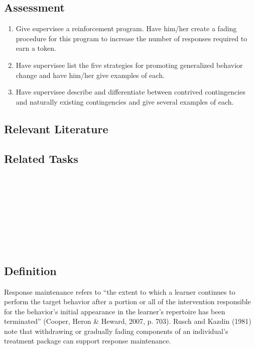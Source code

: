 \subsection{Assessment}
\begin{enumerate}
\item Give supervisee a reinforcement program. Have him/her create a fading procedure for this program to increase the number of responses required to earn a token. 
\item Have supervisee list the five strategies for promoting generalized behavior change and have him/her give examples of each.
\item Have supervisee describe and differentiate between contrived contingencies and naturally existing contingencies and give several examples of each.
%
\end{enumerate}
%
\subsection{Relevant Literature}
\begin{refsection}
\nocite{ayllon1968token,
        baer1999plan,
        cooper2007applied,
        snell2006instruction,
        stokes1977implicit,
        stokes1989operant}
\printbibliography[heading=none]
\end{refsection}
%
\subsection{Related Tasks}
\fourgEight{}\\
\fourjSeven{}\\
\fourjEight{}\\
\fourjEleven{}\\
\fourjTwelve{}\\
\fourkSeven{}\\
\fourkNine{}\\
%
\clearpage \section{\fourjTwelve{}}
\subsection{Definition}
Response maintenance refers to ``the extent to which a learner continues to perform the target behavior after a portion or all of the intervention responsible for the behavior's initial appearance in the learner's repertoire has been terminated'' (Cooper, Heron \& Heward, 2007, p. 703). Rusch and Kazdin (1981) note that withdrawing or gradually fading components of an individual's treatment package can support response maintenance. 

